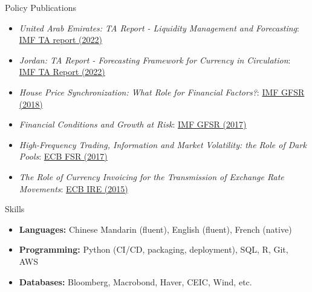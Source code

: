 \documentclass[usegeometry, 10pt, a4paper]{cv} %
\begin{document}
\begin{rubriquetableau}[0.95\textwidth]{Policy Publications}\\
  \vspace{-0.8cm}
\begin{itemize}
\item \textit{United Arab Emirates: TA Report - Liquidity Management and Forecasting}: \href{https://www.imf.org/en/Publications/CR/Issues/2022/07/22/United-Arab-Emirates-Technical-Assistance-Report-Liquidity-Management-and-Forecasting-521194}{IMF TA report (2022)}
\item \textit{Jordan: TA Report - Forecasting Framework for Currency in Circulation}: \href{https://www.imf.org/en/Publications/CR/Issues/2022/04/07/Jordan-Technical-Assistance-Report-Forecasting-Framework-for-Currency-in-Circulation-516259}{IMF TA Report (2022)} 
\item \textit{House Price Synchronization: What Role for Financial Factors?}: \href{https://www.elibrary.imf.org/view/book/9781484338292/ch003.xml}{IMF GFSR (2018)}
\item \textit{Financial Conditions and Growth at Risk}: \href{https://www.elibrary.imf.org/view/book/9781484308394/ch003.xml}{IMF GFSR (2017)}
\item \textit{High-Frequency Trading, Information and Market Volatility: the Role of Dark Pools}: \href{https://www.ecb.europa.eu/pub/pdf/other/ecbmpbu201610.en.pdf}{ECB FSR (2017)}
\item \textit{The Role of Currency Invoicing for the Transmission of Exchange Rate Movements}: \href{https://www.ecb.europa.eu/pub/pdf/ire/article/ecb.ireart201507_01~5e577ddb0f.en.pdf}{ECB IRE (2015)} 
\end{itemize}
\end{rubriquetableau}


\begin{rubriquetableau}[0.98\textwidth]{Skills}
  \vspace{-0.5cm}  
  \begin{itemize}
    \item \textbf{Languages:} Chinese Mandarin (fluent), English (fluent), French (native)
    \item \textbf{Programming:} Python (CI/CD, packaging, deployment), SQL, R, Git, AWS 
    \item \textbf{Databases:} Bloomberg, Macrobond, Haver, CEIC, Wind, etc.
  \end{itemize}
  \end{rubriquetableau}
\end{document}
